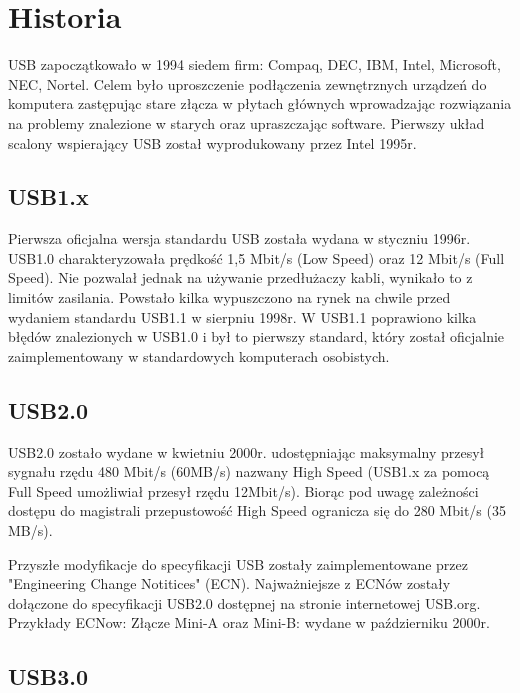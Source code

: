 \documentclass{BscUS}
\begin{document}
%
%
\section{Historia}
USB zapoczątkowało w 1994 siedem firm: Compaq, DEC, IBM, Intel, Microsoft, NEC, Nortel. Celem było uproszczenie podłączenia zewnętrznych urządzeń do komputera zastępując stare złącza w płytach głównych wprowadzając rozwiązania na problemy znalezione w starych oraz upraszczając software.
Pierwszy układ scalony wspierający USB został wyprodukowany przez Intel 1995r.
\newline

\subsection{USB1.x}
Pierwsza oficjalna wersja standardu USB została wydana w styczniu 1996r. USB1.0 charakteryzowała prędkość 1,5 Mbit/s (Low Speed) oraz 12 Mbit/s (Full Speed). Nie pozwalał jednak na używanie przedłużaczy kabli, wynikało to z limitów zasilania. %
Powstało kilka wypuszczono na rynek na chwile przed wydaniem standardu USB1.1 w sierpniu 1998r. W USB1.1 poprawiono kilka błędów znalezionych w USB1.0 i był to pierwszy standard, który został oficjalnie zaimplementowany w standardowych komputerach osobistych.
\subsection{USB2.0}
USB2.0 zostało wydane w kwietniu 2000r. udostępniając maksymalny przesył sygnału rzędu 480 Mbit/s (60MB/s) nazwany High Speed (USB1.x za pomocą Full Speed umożliwiał przesył rzędu 12Mbit/s). Biorąc pod uwagę zależności dostępu do magistrali przepustowość High Speed ogranicza się do 280 Mbit/s (35 MB/s).


Przyszłe modyfikacje do specyfikacji USB zostały zaimplementowane przez "Engineering Change Notitices" (ECN). Najważniejsze z ECNów zostały dołączone do specyfikacji USB2.0 dostępnej na stronie internetowej USB.org.
\newline
Przykłady ECNow:
\newline
Złącze Mini-A oraz Mini-B: wydane w październiku 2000r.
\newline


\subsection{USB3.0}
\end{document}
